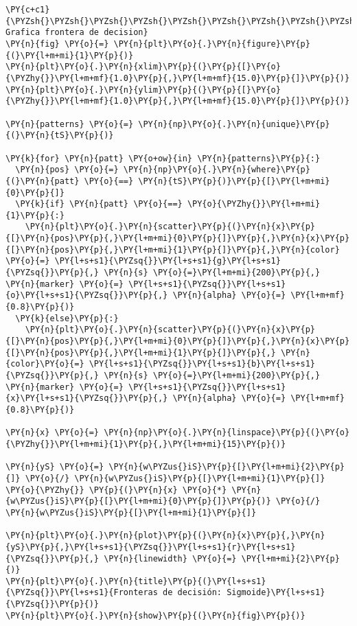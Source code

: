     \begin{tcolorbox}[breakable, size=fbox, boxrule=1pt, pad at break*=1mm,colback=cellbackground, colframe=cellborder]
\begin{Verbatim}[commandchars=\\\{\}]
\PY{c+c1}{\PYZsh{}\PYZsh{}\PYZsh{}\PYZsh{}\PYZsh{}\PYZsh{}\PYZsh{}\PYZsh{}\PYZsh{}\PYZsh{}\PYZsh{}\PYZsh{}\PYZsh{}\PYZsh{}\PYZsh{}\PYZsh{}\PYZpc{}\PYZpc{} Grafica frontera de decision}
\PY{n}{fig} \PY{o}{=} \PY{n}{plt}\PY{o}{.}\PY{n}{figure}\PY{p}{(}\PY{l+m+mi}{1}\PY{p}{)}
\PY{n}{plt}\PY{o}{.}\PY{n}{xlim}\PY{p}{(}\PY{p}{[}\PY{o}{\PYZhy{}}\PY{l+m+mf}{1.0}\PY{p}{,}\PY{l+m+mf}{15.0}\PY{p}{]}\PY{p}{)}
\PY{n}{plt}\PY{o}{.}\PY{n}{ylim}\PY{p}{(}\PY{p}{[}\PY{o}{\PYZhy{}}\PY{l+m+mf}{1.0}\PY{p}{,}\PY{l+m+mf}{15.0}\PY{p}{]}\PY{p}{)}

\PY{n}{patterns} \PY{o}{=} \PY{n}{np}\PY{o}{.}\PY{n}{unique}\PY{p}{(}\PY{n}{tS}\PY{p}{)}

\PY{k}{for} \PY{n}{patt} \PY{o+ow}{in} \PY{n}{patterns}\PY{p}{:}
  \PY{n}{pos} \PY{o}{=} \PY{n}{np}\PY{o}{.}\PY{n}{where}\PY{p}{(}\PY{n}{patt} \PY{o}{==} \PY{n}{tS}\PY{p}{)}\PY{p}{[}\PY{l+m+mi}{0}\PY{p}{]}
  \PY{k}{if} \PY{n}{patt} \PY{o}{==} \PY{o}{\PYZhy{}}\PY{l+m+mi}{1}\PY{p}{:}
    \PY{n}{plt}\PY{o}{.}\PY{n}{scatter}\PY{p}{(}\PY{n}{x}\PY{p}{[}\PY{n}{pos}\PY{p}{,}\PY{l+m+mi}{0}\PY{p}{]}\PY{p}{,}\PY{n}{x}\PY{p}{[}\PY{n}{pos}\PY{p}{,}\PY{l+m+mi}{1}\PY{p}{]}\PY{p}{,}\PY{n}{color} \PY{o}{=} \PY{l+s+s1}{\PYZsq{}}\PY{l+s+s1}{g}\PY{l+s+s1}{\PYZsq{}}\PY{p}{,} \PY{n}{s} \PY{o}{=}\PY{l+m+mi}{200}\PY{p}{,} \PY{n}{marker} \PY{o}{=} \PY{l+s+s1}{\PYZsq{}}\PY{l+s+s1}{o}\PY{l+s+s1}{\PYZsq{}}\PY{p}{,} \PY{n}{alpha} \PY{o}{=} \PY{l+m+mf}{0.8}\PY{p}{)}
  \PY{k}{else}\PY{p}{:}
    \PY{n}{plt}\PY{o}{.}\PY{n}{scatter}\PY{p}{(}\PY{n}{x}\PY{p}{[}\PY{n}{pos}\PY{p}{,}\PY{l+m+mi}{0}\PY{p}{]}\PY{p}{,}\PY{n}{x}\PY{p}{[}\PY{n}{pos}\PY{p}{,}\PY{l+m+mi}{1}\PY{p}{]}\PY{p}{,} \PY{n}{color}\PY{o}{=} \PY{l+s+s1}{\PYZsq{}}\PY{l+s+s1}{b}\PY{l+s+s1}{\PYZsq{}}\PY{p}{,} \PY{n}{s} \PY{o}{=}\PY{l+m+mi}{200}\PY{p}{,} \PY{n}{marker} \PY{o}{=} \PY{l+s+s1}{\PYZsq{}}\PY{l+s+s1}{x}\PY{l+s+s1}{\PYZsq{}}\PY{p}{,} \PY{n}{alpha} \PY{o}{=} \PY{l+m+mf}{0.8}\PY{p}{)}

\PY{n}{x} \PY{o}{=} \PY{n}{np}\PY{o}{.}\PY{n}{linspace}\PY{p}{(}\PY{o}{\PYZhy{}}\PY{l+m+mi}{1}\PY{p}{,}\PY{l+m+mi}{15}\PY{p}{)}

\PY{n}{yS} \PY{o}{=} \PY{n}{w\PYZus{}iS}\PY{p}{[}\PY{l+m+mi}{2}\PY{p}{]} \PY{o}{/} \PY{n}{w\PYZus{}iS}\PY{p}{[}\PY{l+m+mi}{1}\PY{p}{]} \PY{o}{\PYZhy{}} \PY{p}{(}\PY{n}{x} \PY{o}{*} \PY{n}{w\PYZus{}iS}\PY{p}{[}\PY{l+m+mi}{0}\PY{p}{]}\PY{p}{)} \PY{o}{/} \PY{n}{w\PYZus{}iS}\PY{p}{[}\PY{l+m+mi}{1}\PY{p}{]}

\PY{n}{plt}\PY{o}{.}\PY{n}{plot}\PY{p}{(}\PY{n}{x}\PY{p}{,}\PY{n}{yS}\PY{p}{,}\PY{l+s+s1}{\PYZsq{}}\PY{l+s+s1}{r}\PY{l+s+s1}{\PYZsq{}}\PY{p}{,} \PY{n}{linewidth} \PY{o}{=} \PY{l+m+mi}{2}\PY{p}{)}
\PY{n}{plt}\PY{o}{.}\PY{n}{title}\PY{p}{(}\PY{l+s+s1}{\PYZsq{}}\PY{l+s+s1}{Fronteras de decisión: Sigmoide}\PY{l+s+s1}{\PYZsq{}}\PY{p}{)}
\PY{n}{plt}\PY{o}{.}\PY{n}{show}\PY{p}{(}\PY{n}{fig}\PY{p}{)}
\end{Verbatim}
\end{tcolorbox}

